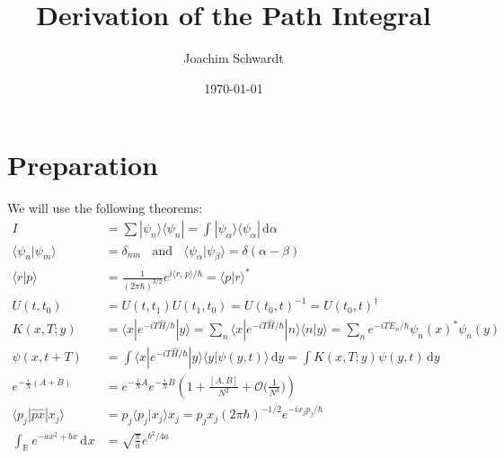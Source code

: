 \documentclass[a4paper,12pt]{article}
\newcommand{\bra}{}
\newcommand{\brak}{}
\newcommand{\braket}{}
\newcommand{\intx}{}
\newcommand{\intr}{}
\newcommand{\kla}{}
\newcommand{\oper}{}
\begin{document}
\title{Derivation of the Path Integral}
\author{Joachim Schwardt}
\date{\today}
\maketitle

\section{Preparation}
We will use the following theorems:
\begin{align*}
I&=\sum \oper |\psi_n\rangle\langle \psi_n|=\intx\int_{ }^{ }\oper |\psi_\alpha\rangle\langle \psi_\alpha|\,\mathrm{d}\alpha\\
\brak\langle {\psi_n}| {\psi_m}\rangle&=\delta_{nm}\ \ \ \ \mathrm{and}\ \ \ \ \brak\langle {\psi_\alpha}| {\psi_\beta}\rangle=\delta(\alpha-\beta)\\
\brak\langle {r}| {p}\rangle &=\frac{1}{(2\pi\hbar)^{3/2}}e^{i\bra\langle {r,\,p}\rangle/\hbar}=\brak\langle {p}| {r}\rangle^\ast\\
U(t,t_0)&=U(t,t_1)U(t_1,t_0)=U(t_0,t)^{-1}=U(t_0,t)^\dagger\\
K(x,T;y)&=\braket\langle {x} | {e^{-iT\hat{H}/\hbar}} | {y}\rangle=\sum_n\braket\langle {x} | e^{-iT\hat{H}/\hbar} | {n}\rangle\brak\langle {n}| {y}\rangle=\sum_ne^{-iTE_n/\hbar}\psi_n(x)^\ast\psi_n(y)\\
\psi(x,t+T)&=\int\braket\langle {x} | e^{-iT\hat{H}/\hbar} | {y}\rangle\brak\langle {y}| {\psi(y,t)}\rangle\,\mathrm{d}y=\int K(x,T;y)\psi(y,t)\,\mathrm{d}y\\
e^{-\frac{i}{N}(A+B)}&=e^{-\frac{i}{N}A}e^{-\frac{i}{N}B}\kla\left( {1+\frac{[A,B]}{N^2}+\mathcal{O}\Big(\frac{1}{N^3}\Big)} \right)\\
\braket\langle {p_j} | {\hat{p}\hat{x}} | {x_j}\rangle&=p_j\brak\langle {p_j}| {x_j}\rangle x_j=p_jx_j(2\pi\hbar)^{-1/2}e^{-ix_jp_j/\hbar}\\
\intr\int_{\mathbb{R}^{ }}{e^{-ax^2+bx}}\,\mathrm{d}^{ }x&=\sqrt{\frac{\pi}{a}}e^{b^2/4a}
\end{align*}
\end{document}
